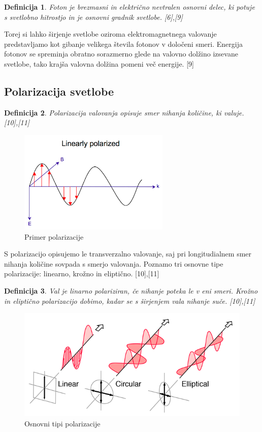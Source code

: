 \documentclass[A4paper, 11pt]{article}
\newtheorem{definicija}{Definicija}
\begin{document}
\begin{definicija}
Foton je brezmasni in električno nevtralen osnovni delec, ki potuje s svetlobno hitrostjo in je osnovni gradnik svetlobe. [6],[9]
\end{definicija} 

Torej si lahko širjenje svetlobe oziroma elektromagnetnega valovanje predstavljamo kot gibanje velikega števila fotonov v določeni smeri. Energija fotonov se spreminja obratno sorazmerno glede na valovno dolžino izsevane svetlobe, tako krajša valovna dolžina pomeni več energije. [9]

\subsection{Polarizacija svetlobe}

\begin{definicija}
Polarizacija valovanja opisuje smer nihanja količine, ki valuje. [10],[11]
\end{definicija}

\begin{figure}[h]
\centering
\caption{Primer polarizacije}
\includegraphics[scale=0.75]{images}
\end{figure}

S polarizacijo opisujemo le transverzalno valovanje, saj pri longitudialnem smer nihanja količine sovpada s smerjo valovanja. Poznamo tri osnovne tipe polarizacije: linearno, krožno in eliptično. [10],[11]

\begin{definicija}
Val je linarno polariziran, če nihanje poteka le v eni smeri. Krožno in eliptično polarizacijo dobimo, kadar se s širjenjem vala nihanje suče. [10],[11]
\end{definicija}

\begin{figure}[h]
\centering
\caption{Osnovni tipi polarizacije}
\includegraphics[scale=2]{polcls}
\end{figure}
\end{document}
